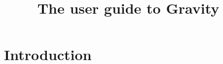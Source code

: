 \documentclass[final,5p,times,twocolumn]{elsarticle}
\begin{document}
 

\begin{frontmatter}
\title{The user guide to Gravity }
\begin{abstract}
\end{abstract}
\begin{keyword}
\end{keyword}
\end{frontmatter}

\section{Introduction}
\end{document}
